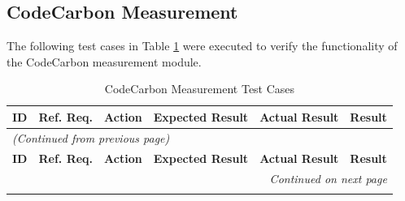 \documentclass[12pt, titlepage]{article}
\begin{document}
\subsection{CodeCarbon Measurement}
The following test cases in Table \ref{table:measurement_tests} were executed to verify the functionality of the CodeCarbon measurement module.

\begin{longtable}{c
    >{\raggedright\arraybackslash}p{1.5cm}
    >{\raggedright\arraybackslash}p{4.5cm}
    >{\raggedright\arraybackslash}p{4cm}
  >{\raggedright\arraybackslash}p{3cm} c}
  \toprule
  \textbf{ID} & \textbf{Ref. Req.} & \textbf{Action} &
  \textbf{Expected Result} & \textbf{Actual Result} & \textbf{Result} \\
  \midrule
  \endfirsthead

  \multicolumn{6}{l}{\textit{(Continued from previous page)}} \\
  \toprule
  \textbf{ID} & \textbf{Ref. Req.} & \textbf{Action} &
  \textbf{Expected Result} & \textbf{Actual Result} & \textbf{Result} \\
  \midrule
  \endhead

  \multicolumn{6}{r}{\textit{Continued on next page}} \\
  \endfoot

  \bottomrule
  \caption{CodeCarbon Measurement Test Cases}
  \label{table:measurement_tests}
  \endlastfoot


\end{longtable}
\end{document}
